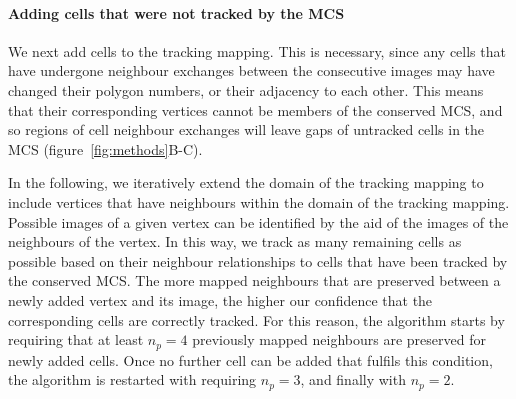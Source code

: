 \documentclass[a4paper,11pt]{article}
\begin{document}

\paragraph{Adding cells that were not tracked by the MCS}

We next add cells to the tracking mapping. 
This is necessary, since any cells that have undergone neighbour exchanges between the consecutive images may have changed their polygon numbers, or their adjacency to each other. 
This means that their corresponding vertices cannot be members of the conserved MCS, and so regions of cell neighbour exchanges will leave gaps of untracked cells in the MCS (figure~\ref{fig:methods}B-C).

In the following, we iteratively extend the domain of the tracking mapping to include vertices that have neighbours within the domain of the tracking mapping. 
Possible images of a given vertex can be identified by the aid of the images of the neighbours of the vertex. 
In this way, we track as many remaining cells as possible based on their neighbour relationships to cells that have been tracked by the conserved MCS.
The more mapped neighbours that are preserved between a newly added vertex and its image, the higher our confidence that the corresponding cells are correctly tracked. 
For this reason, the algorithm starts by requiring that at least $n_p = 4$ previously mapped neighbours are preserved for newly added cells. 
Once no further cell can be added that fulfils this condition, the algorithm is restarted with requiring $n_p = 3$, and finally with $n_p = 2$.
\end{document}
